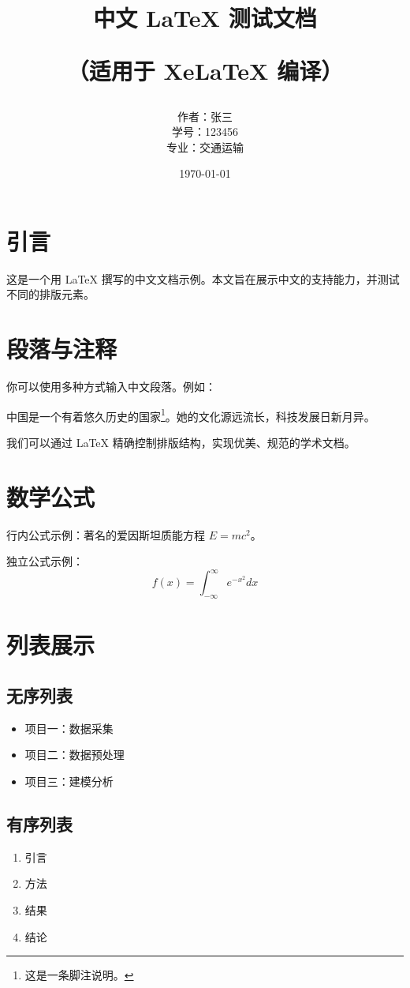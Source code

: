 \documentclass[12pt]{article}
\title{\Huge 中文 LaTeX 测试文档\par \vspace{1em} \Large（适用于 XeLaTeX 编译）}
\author{\large 作者：张三\\ 学号：123456\\ 专业：交通运输}
\date{\today}
\begin{document}
\maketitle
\cleardoublepage

\tableofcontents
\cleardoublepage

\section{引言}
这是一个用 \LaTeX{} 撰写的中文文档示例。本文旨在展示中文的支持能力，并测试不同的排版元素。

\section{段落与注释}
你可以使用多种方式输入中文段落。例如：

中国是一个有着悠久历史的国家\footnote{这是一条脚注说明。}。她的文化源远流长，科技发展日新月异。

我们可以通过 \LaTeX{} 精确控制排版结构，实现优美、规范的学术文档。

\section{数学公式}
行内公式示例：著名的爱因斯坦质能方程 $E = mc^2$。

独立公式示例：
\[
f(x) = \int_{-\infty}^{\infty} e^{-x^2} dx
\]

\section{列表展示}
\subsection{无序列表}
\begin{itemize}
    \item 项目一：数据采集
    \item 项目二：数据预处理
    \item 项目三：建模分析
\end{itemize}

\subsection{有序列表}
\begin{enumerate}
    \item 引言
    \item 方法
    \item 结果
    \item 结论
\end{enumerate}
\end{document}
